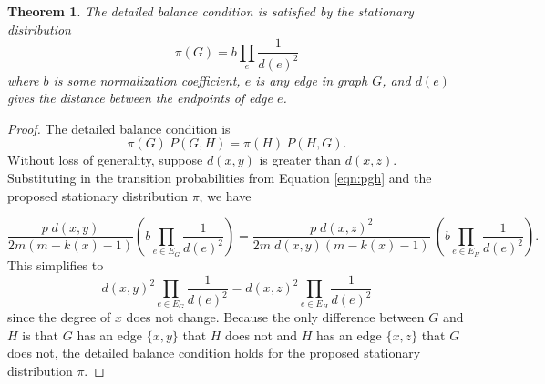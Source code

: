 \documentclass[a4paper,10pt]{article}
\newtheorem{theorem}{Theorem}
\begin{document}
\begin{theorem}
  The detailed balance condition is satisfied by the stationary distribution
\begin{equation}
 \pi(G) = b \prod_{e} \frac{1}{d(e)^2}
\end{equation}
where $b$ is some normalization coefficient, $e$ is any edge in graph $G$, and $d(e)$ gives the distance between the endpoints of edge $e$.
\end{theorem}
\begin{proof}
 The detailed balance condition is
 \begin{equation}
 \pi(G) \: P(G, H) = \pi(H) \: P(H, G).
\end{equation}
Without loss of generality, suppose $d(x, y)$ is greater than $d(x, z)$. Substituting in the transition probabilities from Equation \ref{eqn:pgh} and the proposed stationary distribution $\pi$, we have

\begin{equation}
\frac{ p \; d(x, y)}{2m \left(m - k(x) - 1\right)}
\left(b\prod_{e \in E_G} \frac{1}{d(e)^2}\right) =
\frac{ p \; d(x, z)^2}{2m \; d(x, y) \left(m - k(x) - 1\right)}\:
\left(b\prod_{e \in E_H} \frac{1}{d(e)^2}\right).
\end{equation}
This simplifies to
\begin{equation}
d(x, y)^2 \prod_{e \in E_G} \frac{1}{d(e)^2} =
d(x, z)^2 \prod_{e \in E_H} \frac{1}{d(e)^2}
\end{equation}
since the degree of $x$ does not change. Because the only difference between $G$ and $H$ is that $G$ has an edge $\{x, y\}$ that $H$ does not and $H$ has an edge $\{x, z\}$ that $G$ does not, the detailed balance condition holds for the proposed stationary distribution $\pi$.
\end{proof}
\end{document}
